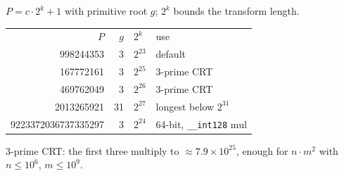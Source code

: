 $P = c \cdot 2^k + 1$ with primitive root $g$; $2^k$ bounds the transform length.

\noindent\begin{tabular}{@{}rrll@{}}
$P$ & $g$ & $2^k$ & use \\
998244353 & 3 & $2^{23}$ & default \\
167772161 & 3 & $2^{25}$ & 3-prime CRT \\
469762049 & 3 & $2^{26}$ & 3-prime CRT \\
2013265921 & 31 & $2^{27}$ & longest below $2^{31}$ \\
9223372036737335297 & 3 & $2^{24}$ & 64-bit, \texttt{\_\_int128} mul \\
\end{tabular}

3-prime CRT: the first three multiply to $\approx 7.9 \times 10^{25}$, enough for $n \cdot m^2$ with $n \le 10^6$, $m \le 10^9$.
